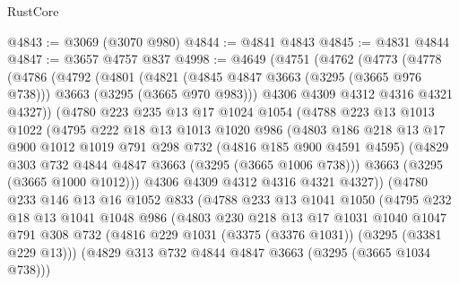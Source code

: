 \begin{lexlean}{RustCore}
\begin{coremodule}
@4843 := @3069 (@3070 @980)
@4844 := @4841 @4843
@4845 := @4831 @4844
@4847 := @3657 @4757 @837
@4998 := @4649
    (@4751
      (@4762
        (@4773
          (@4778
            (@4786
              (@4792
                (@4801
                  (@4821
                    (@4845 @4847 @3663 (@3295 (@3665 @976 @738)))
                    @3663
                    (@3295 (@3665 @970 @983)))
                  @4306
                  @4309
                  @4312
                  @4316
                  @4321
                  @4327))
              (@4780
                @223
                @235
                @13
                @17
                @1024
                @1054
                (@4788
                  @223
                  @13
                  @1013
                  @1022
                  (@4795
                    @222
                    @18
                    @13
                    @1013
                    @1020
                    @986
                    (@4803
                      @186
                      @218
                      @13
                      @17
                      @900
                      @1012
                      @1019
                      @791
                      @298
                      @732
                      (@4816 @185 @900 @4591 @4595)
                      (@4829 @303 @732 @4844 @4847 @3663 (@3295 (@3665 @1006 @738)))
                      @3663
                      (@3295 (@3665 @1000 @1012)))
                    @4306
                    @4309
                    @4312
                    @4316
                    @4321
                    @4327))
                (@4780
                  @233
                  @146
                  @13
                  @16
                  @1052
                  @833
                  (@4788
                    @233
                    @13
                    @1041
                    @1050
                    (@4795
                      @232
                      @18
                      @13
                      @1041
                      @1048
                      @986
                      (@4803
                        @230
                        @218
                        @13
                        @17
                        @1031
                        @1040
                        @1047
                        @791
                        @308
                        @732
                        (@4816 @229 @1031 (@3375 (@3376 @1031)) (@3295 (@3381 @229 @13)))
                        (@4829 @313 @732 @4844 @4847 @3663 (@3295 (@3665 @1034 @738)))

\end{coremodule}
\end{lexlean}
